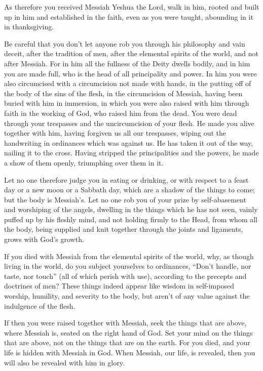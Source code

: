\myverse{}As therefore you received Messiah Yeshua the Lord, walk in him,
\myverse{}rooted and built up in him and established in the faith, even as you were taught,
abounding in it in thanksgiving.

\myverse{}Be careful that you don’t let anyone rob you through his philosophy
and vain deceit, after the tradition of men, after the elemental spirits of the world, and not after Messiah.
\myverse{}For in him all the fullness of the Deity dwells bodily,
\myverse{}and in him you are made full, who is the head of all principality and power.
\myverse{}In him you were also circumcised with a circumcision not made with hands,
in the putting off of the body of the sins of the flesh, in the circumcision of Messiah,
\myverse{}having been buried with him in immersion, in which you were also raised with
him through faith in the working of God, who raised him from the dead.
\myverse{}You were dead through your trespasses and the uncircumcision of your flesh.
He made you alive together with him, having forgiven us all our trespasses,
\myverse{}wiping out the handwriting in ordinances which was against us. He has taken
it out of the way, nailing it to the cross.
\myverse{}Having stripped the principalities and the powers, he made a show of them
openly, triumphing over them in it.

\myverse{}Let no one therefore judge you in eating or drinking, or with
respect to a feast day or a new moon or a Sabbath day,
\myverse{}which are a shadow of the things to come; but the body is Messiah’s.
\myverse{}Let no one rob you of your prize by self-abasement and worshiping of the angels,
dwelling in the things which he has not seen, vainly puffed up by his fleshly mind,
\myverse{}and not holding firmly to the Head, from whom all the body, being supplied
and knit together through the joints and ligaments, grows with God’s growth.

\myverse{}If you died with Messiah from the elemental spirits of the world,
why, as though living in the world, do you subject yourselves to ordinances,
\myverse{}“Don’t handle, nor taste, nor touch”
\myverse{}(all of which perish with use), according to the precepts and doctrines of
men?
\myverse{}These things indeed appear like wisdom in self-imposed worship, humility,
and severity to the body, but aren’t of any value against the indulgence of the flesh.


\mychapter{} \myverse*{}If then you were raised together with Messiah, seek the things
that are above, where Messiah is, seated on the right hand of God.
\myverse{}Set your mind on the things that are above, not on the things that are on the
earth.
\myverse{}For you died, and your life is hidden with Messiah in God.
\myverse{}When Messiah, our life, is revealed, then you will also be revealed with him
in glory.

